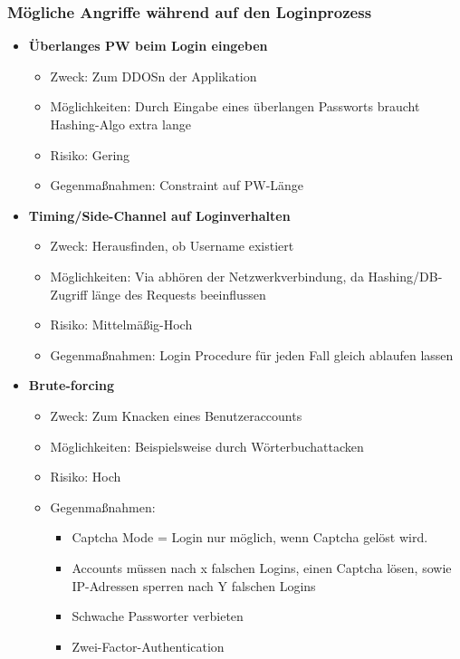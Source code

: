 \documentclass[12pt,DIV14,BCOR10mm,a4paper,twoside,parskip=half-,headsepline,headinclude,english,ngerman,bibliography=totocnumbered]{scrreprt}
\begin{document}
\subsubsection{Mögliche Angriffe während auf den Loginprozess}

\begin{itemize}
  \item \textbf{Überlanges PW beim Login eingeben}
  \begin{itemize}
  \item Zweck: Zum DDOSn der Applikation
  \item Möglichkeiten: Durch Eingabe eines überlangen Passworts braucht Hashing-Algo extra lange
  \item Risiko: Gering
  \item Gegenmaßnahmen: Constraint auf PW-Länge
  \end{itemize}

  \item \textbf{Timing/Side-Channel auf Loginverhalten}
  \begin{itemize}
  \item Zweck: Herausfinden, ob Username existiert
  \item Möglichkeiten: Via abhören der Netzwerkverbindung, da Hashing/DB-Zugriff länge des Requests beeinflussen
  \item Risiko: Mittelmäßig-Hoch
  \item Gegenmaßnahmen: Login Procedure für jeden Fall gleich ablaufen lassen
  \end{itemize}

  \item \textbf{Brute-forcing}
  \begin{itemize}
  \item Zweck: Zum Knacken eines Benutzeraccounts
  \item Möglichkeiten: Beispielsweise durch Wörterbuchattacken
  \item Risiko: Hoch
  \item Gegenmaßnahmen:
  \begin{itemize}
      \item Captcha Mode = Login nur möglich, wenn Captcha gelöst wird.
      \item Accounts müssen nach x falschen Logins, einen Captcha lösen, sowie IP-Adressen sperren nach Y falschen Logins
      \item Schwache Passworter verbieten
      \item Zwei-Factor-Authentication
    \end{itemize}
  \end{itemize}
\end{itemize}
\end{document}
